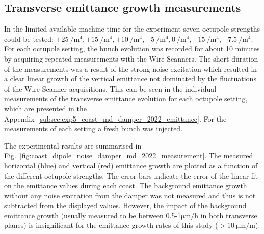 \subsection{Transverse emittance growth measurements}
In the limited available machine time for the experiment seven octupole strengths could be tested: $+25 \ \mathrm{/m^4}, +15 \ \mathrm{/m^4}, +10 \ \mathrm{/m^4}, +5 \ \mathrm{/m^4}, 0 \ \mathrm{/m^4}, -15 \ \mathrm{/m^4}, -7.5 \ \mathrm{/m^4}$. %
For each octupole setting, the bunch evolution was recorded for about 10 minutes by acquiring repeated measurements with the Wire Scanners. The short duration of the measurements was a result of the strong noise excitation which resulted in a clear linear growth of the vertical emittance not dominated by the fluctuations of the Wire Scanner acquisitions. This can be seen in the individual measurements of the transverse emittance evolution for each octupole setting, which are presented in the Appendix~\ref{subsec:exp5_coast_md_damper_2022_emittance}. For the measurements of each setting a fresh bunch was injected. 

The experimental results are summarised in Fig.~\ref{fig:coast_dipole_noise_damper_md_2022_measurement}. The measured horizontal (blue) and vertical (red) emittance growth are plotted as a function of the different octupole strengths. The error bars indicate the error of the linear fit on the emittance values during each coast. The background emittance growth without any noise excitation from the damper was not measured and thus is not subtracted from the displayed values. However, the impact of the background emittance growth (usually measured to be between 0.5-1$\mathrm{\mu m/h}$ in both transverse planes) is insignificant for the emittance growth rates of this study ($ > 10 \ \mathrm{\mu m/m}$).
 


